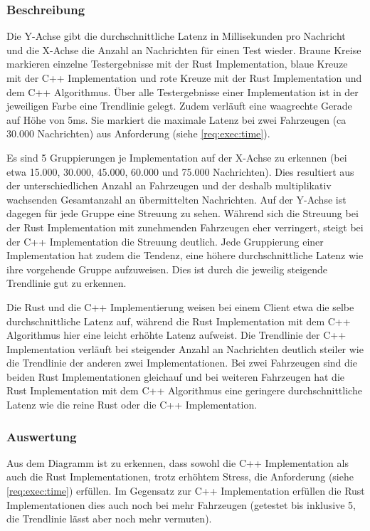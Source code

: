
\subsubsection{Beschreibung}

Die Y-Achse gibt die durchschnittliche Latenz in Millisekunden pro Nachricht und die X-Achse die Anzahl an Nachrichten für einen Test wieder.
Braune Kreise markieren einzelne Testergebnisse mit der Rust Implementation, blaue Kreuze mit der C++ Implementation und rote Kreuze mit der Rust Implementation und dem C++ Algorithmus.
Über alle Testergebnisse einer Implementation ist in der jeweiligen Farbe eine Trendlinie gelegt.
Zudem verläuft eine waagrechte Gerade auf Höhe von 5ms. Sie markiert die maximale Latenz bei zwei Fahrzeugen (ca 30.000 Nachrichten) aus Anforderung  (siehe \autoref{req:exec:time}).

Es sind 5 Gruppierungen je Implementation auf der X-Achse zu erkennen (bei etwa 15.000, 30.000, 45.000, 60.000 und 75.000 Nachrichten).
Dies resultiert aus der unterschiedlichen Anzahl an Fahrzeugen und der deshalb multiplikativ wachsenden Gesamtanzahl an übermittelten Nachrichten.
Auf der Y-Achse ist dagegen für jede Gruppe eine Streuung zu sehen.
Während sich die Streuung bei der Rust Implementation mit zunehmenden Fahrzeugen eher verringert, steigt bei der C++ Implementation die Streuung deutlich.
Jede Gruppierung einer Implementation hat zudem die Tendenz, eine höhere durchschnittliche Latenz wie ihre vorgehende Gruppe aufzuweisen.
Dies ist durch die jeweilig steigende Trendlinie gut zu erkennen.

Die Rust und die C++ Implementierung weisen bei einem Client etwa die selbe durchschnittliche Latenz auf, während die Rust Implementation mit dem C++ Algorithmus hier eine leicht erhöhte Latenz aufweist.
Die Trendlinie der C++ Implementation verläuft bei steigender Anzahl an Nachrichten deutlich steiler wie die Trendlinie der anderen zwei Implementationen.
Bei zwei Fahrzeugen sind die beiden Rust Implementationen gleichauf und bei weiteren Fahrzeugen hat die Rust Implementation mit dem C++ Algorithmus eine geringere durchschnittliche Latenz wie die reine Rust oder die C++ Implementation.

\subsubsection{Auswertung}

Aus dem Diagramm ist zu erkennen, dass sowohl die C++ Implementation als auch die Rust Implementationen, trotz erhöhtem Stress, die Anforderung  (siehe \autoref{req:exec:time}) erfüllen.
Im Gegensatz zur C++ Implementation erfüllen die Rust Implementationen dies auch noch bei mehr Fahrzeugen (getestet bis inklusive 5, die Trendlinie lässt aber noch mehr vermuten).

